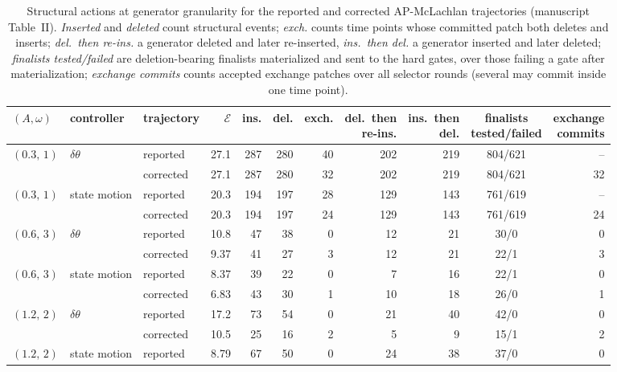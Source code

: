 \documentclass[10pt]{article}
\begin{document}
\begin{table}[H]\centering\scriptsize\setlength{\tabcolsep}{3.5pt}
\caption{Structural actions at generator granularity for the reported and corrected AP-McLachlan trajectories (manuscript Table~II).  \emph{Inserted} and \emph{deleted} count structural events; \emph{exch.} counts time points whose committed patch both deletes and inserts; \emph{del.\ then re-ins.} a generator deleted and later re-inserted, \emph{ins.\ then del.} a generator inserted and later deleted; \emph{finalists tested/failed} are deletion-bearing finalists materialized and sent to the hard gates, over those failing a gate after materialization; \emph{exchange commits} counts accepted exchange patches over all selector rounds (several may commit inside one time point).}
\begin{tabular}{lllrrrrrrcr}\toprule
$(A,\omega)$ & controller & trajectory & $\mathcal E$ & ins. & del. & exch. & \shortstack{del.\ then\\re-ins.} & \shortstack{ins.\ then\\del.} & \shortstack{finalists\\tested/failed} & \shortstack{exchange\\commits} \\ \midrule
$(0.3,\,1)$ & $\delta\theta$ & reported & 27.1 & 287 & 280 & 40 & 202 & 219 & 804/621 & -- \\
 &  & corrected & 27.1 & 287 & 280 & 32 & 202 & 219 & 804/621 & 32 \\
\addlinespace[2pt]
$(0.3,\,1)$ & state motion & reported & 20.3 & 194 & 197 & 28 & 129 & 143 & 761/619 & -- \\
 &  & corrected & 20.3 & 194 & 197 & 24 & 129 & 143 & 761/619 & 24 \\
\addlinespace[2pt]
$(0.6,\,3)$ & $\delta\theta$ & reported & 10.8 & 47 & 38 & 0 & 12 & 21 & 30/0 & 0 \\
 &  & corrected & 9.37 & 41 & 27 & 3 & 12 & 21 & 22/1 & 3 \\
\addlinespace[2pt]
$(0.6,\,3)$ & state motion & reported & 8.37 & 39 & 22 & 0 & 7 & 16 & 22/1 & 0 \\
 &  & corrected & 6.83 & 43 & 30 & 1 & 10 & 18 & 26/0 & 1 \\
\addlinespace[2pt]
$(1.2,\,2)$ & $\delta\theta$ & reported & 17.2 & 73 & 54 & 0 & 21 & 40 & 42/0 & 0 \\
 &  & corrected & 10.5 & 25 & 16 & 2 & 5 & 9 & 15/1 & 2 \\
\addlinespace[2pt]
$(1.2,\,2)$ & state motion & reported & 8.79 & 67 & 50 & 0 & 24 & 38 & 37/0 & 0 \\

\end{tabular}
\end{table}
\end{document}
